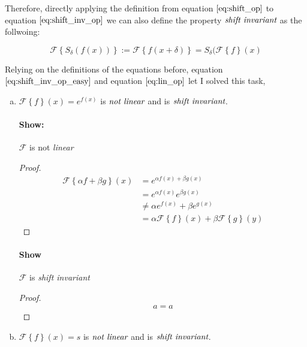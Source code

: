 \documentclass{paper}
\begin{document}
Therefore, directly applying the definition from equation $\ref{eq:shift_op}$ to equation $\ref{eq:shift_inv_op}$ we can also define the property $\emph{shift invariant}$ as the follwoing:

\begin{equation}
    \mathcal{F} \left \{S_\delta (f(x)) \right\} := \mathcal{F} \left\{ f(x+\delta) \right\} = S_\delta(\mathcal{F}\left \{f \right\}(x)
\label{eq:shift_inv_op_easy}
\end{equation}

Relying on the definitions of the equations before, equation $\ref{eq:shift_inv_op_easy}$ and equation $\ref{eq:lin_op}$ let I solved this task,

\begin{enumerate}[(a)] 
\item $\mathcal{F} \left \{ f \right\} (x) = e^{f(x)}$ is $\emph{not linear}$ and is $\emph{shift invariant}$. 

\paragraph{Show:} $\mathcal{F}$ is not \emph{linear} \\
\begin{proof}
\begin{align*}
    \mathcal{F} \left \{\alpha f + \beta g \right\}(x) 
    &= e^{\alpha f(x) + \beta g(x)} \\
    &= e^{\alpha f(x)} e^{\beta g(x)}\\
    &\neq \alpha e^{f(x)} + \beta e^{g(x)}\\
    &= \alpha \mathcal{F} \left \{f\right\}(x) + \beta \mathcal{F} \left \{g \right\}(y)
\end{align*}
\end{proof}

\paragraph{Show} $\mathcal{F}$ is \emph{shift invariant} \\
\begin{proof}
\begin{align*}
    a = a
\end{align*}
\end{proof}



\item $\mathcal{F} \left \{ f \right\} (x) = s$ is $\emph{not linear}$ and is $\emph{shift invariant}$.


\end{enumerate}
\end{document}
